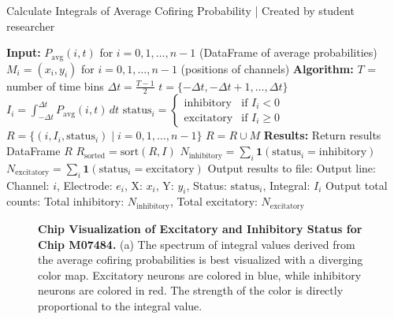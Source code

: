 \documentclass{article} %
\begin{document}
\begin{singlespace}
    \begin{algorithm}
    \caption{Calculate Integrals of Average Cofiring Probability | Created by student researcher}
        \begin{algorithmic}[1]
            \State \textbf{Input:}
            \State  $P_{\text{avg}}(i, t)$ for $i = 0, 1, \ldots, n-1$ (DataFrame of average probabilities)
            \State  $M_{i} = (x_{i}, y_{i})$ for $i = 0, 1, \ldots, n-1$ (positions of channels)
            \State
            \State \textbf{Algorithm:}
            \State  $T$ = number of time bins
            \State  $\Delta t = \frac{T - 1}{2}$
            \State  $t = \{-\Delta t, -\Delta t + 1, \ldots, \Delta t\}$
                \State $I_{i} = \int_{-\Delta t}^{\Delta t} P_{\text{avg}}(i, t) \, dt$
                \State $\text{status}_{i} = 
                \begin{cases} 
                \text{inhibitory} & \text{if } I_{i} < 0 \\
                \text{excitatory} & \text{if } I_{i} \geq 0 
                \end{cases}$
            \EndFor
            \State $R = \{(i, I_{i}, \text{status}_{i}) \mid i = 0, 1, \ldots, n-1\}$
            \State $R = R \cup M$
            \State
            \State \textbf{Results:}
            \State  Return results DataFrame $R$
            \State  $R_{\text{sorted}} = \text{sort}(R, I)$
            \State  $N_{\text{inhibitory}} = \sum_{i} \mathbf{1}(\text{status}_{i} = \text{inhibitory})$
            \State  $N_{\text{excitatory}} = \sum_{i} \mathbf{1}(\text{status}_{i} = \text{excitatory})$
            \State  Output results to file: 
                \State Output line: Channel: $i$, Electrode: $e_{i}$, X: $x_{i}$, Y: $y_{i}$, Status: $\text{status}_{i}$, Integral: $I_{i}$
            \EndFor
            \State Output total counts: Total inhibitory: $N_{\text{inhibitory}}$, Total excitatory: $N_{\text{excitatory}}$
        \end{algorithmic}
    \end{algorithm}
\end{singlespace}



\begin{figure}
    \centering
    \caption{\textbf{Chip Visualization of Excitatory and Inhibitory Status for Chip M07484.} (a) The spectrum of integral values derived from the average cofiring probabilities is best visualized with a diverging color map. Excitatory neurons are colored in blue, while inhibitory neurons are colored in red. The strength of the color is directly proportional to the integral value.}
\end{figure}
\end{document}
